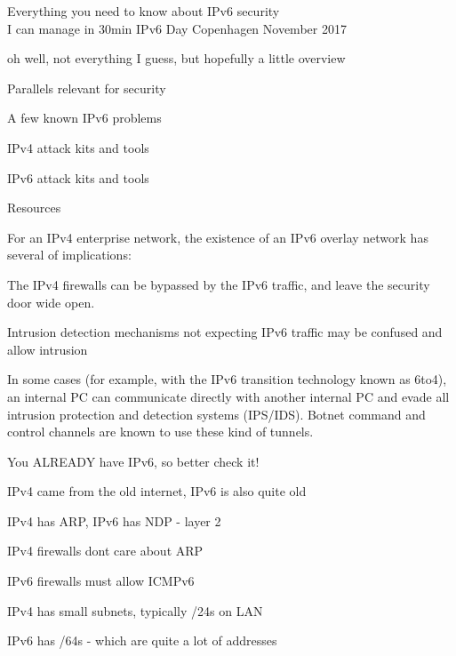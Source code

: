 \documentclass[18pt,landscape,a4paper,footrule]{foils}
\begin{document}
\mytitlepage
{Everything you need to know about IPv6 security\\I can manage in 30min}
{IPv6 Day Copenhagen November 2017}


oh well, not everything I guess, but hopefully a little overview

\begin{list2}
\item Parallels relevant for security
\item A few known IPv6 problems
\item IPv4 attack kits and tools
\item IPv6 attack kits and tools
\item Resources
\end{list2}



\begin{list1}
\item For an IPv4 enterprise network, the existence of an IPv6 overlay network has several of implications:
\begin{list2}
\item The IPv4 firewalls can be bypassed by the IPv6 traffic, and leave the security door wide open.
\item Intrusion detection mechanisms not expecting IPv6 traffic may be confused and allow intrusion
\item In some cases (for example, with the IPv6 transition technology known as 6to4), an internal PC can communicate directly with another internal PC and evade all intrusion protection and detection systems (IPS/IDS). Botnet command and control channels are known to use these kind of tunnels.
\end{list2}
\end{list1}

\vskip 1cm
\centerline{You ALREADY have IPv6, so better check it!}


IPv4 came from the old internet, IPv6 is also quite old
\begin{list2}
\item IPv4 has ARP, IPv6 has NDP - layer 2
\item IPv4 firewalls dont care about ARP
\item IPv6 firewalls must allow ICMPv6\\
\item IPv4 has small subnets, typically /24s on LAN
\item IPv6 has /64s - which are quite a lot of addresses
\end{list2}
\end{document}
